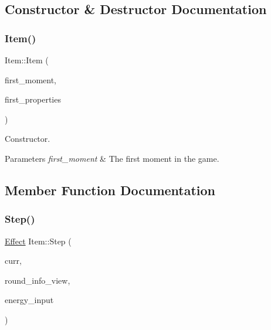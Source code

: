 \subsection{Constructor \& Destructor Documentation}
\mbox{\label{classitem_1_1_item_aebe9569e9074ee805b6213f500066115}} 
\subsubsection{\texorpdfstring{Item()}{Item()}}
{\footnotesize\ttfamily Item\+::\+Item (\begin{DoxyParamCaption}\item[{\hyperlink{classtimeplane_1_1_moment}{Moment}}]{first\+\_\+moment,  }\item[{\hyperlink{classitem_1_1_item_properties}{Item\+Properties} const \&}]{first\+\_\+properties }\end{DoxyParamCaption})\hspace{0.3cm}{\ttfamily [protected]}}



Constructor. 


\begin{DoxyParams}{Parameters}
{\em first\+\_\+moment} & The first moment in the game. \\
\hline
\end{DoxyParams}


\subsection{Member Function Documentation}
\mbox{\label{classitem_1_1_item_ad8d77979820782fd86a0a67e2ea25c75}} 
\subsubsection{\texorpdfstring{Step()}{Step()}}
{\footnotesize\ttfamily \hyperlink{classitem_1_1_effect}{Effect} Item\+::\+Step (\begin{DoxyParamCaption}\item[{\hyperlink{classtimeplane_1_1_moment}{Moment}}]{curr,  }\item[{\hyperlink{classroundinfo_1_1_round_info_view}{Round\+Info\+View} const \&}]{round\+\_\+info\+\_\+view,  }\item[{int}]{energy\+\_\+input }\end{DoxyParamCaption})}



